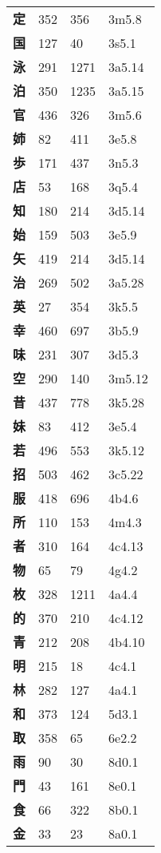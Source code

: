 \begin{longtable}[c]{llll}
    \bfseries 定 & 352 & 356 & 3m5.8\\
    \bfseries 国 & 127 & 40 & 3s5.1\\
    \bfseries 泳 & 291 & 1271 & 3a5.14\\
    \bfseries 泊 & 350 & 1235 & 3a5.15\\
    \bfseries 官 & 436 & 326 & 3m5.6\\
    \bfseries 姉 & 82 & 411 & 3e5.8\\
    \bfseries 歩 & 171 & 437 & 3n5.3\\
    \bfseries 店 & 53 & 168 & 3q5.4\\
    \bfseries 知 & 180 & 214 & 3d5.14\\
    \bfseries 始 & 159 & 503 & 3e5.9\\
    \bfseries 矢 & 419 & 214 & 3d5.14\\
    \bfseries 治 & 269 & 502 & 3a5.28\\
    \bfseries 英 & 27 & 354 & 3k5.5\\
    \bfseries 幸 & 460 & 697 & 3b5.9\\
    \bfseries 味 & 231 & 307 & 3d5.3\\
    \bfseries 空 & 290 & 140 & 3m5.12\\
    \bfseries 昔 & 437 & 778 & 3k5.28\\
    \bfseries 妹 & 83 & 412 & 3e5.4\\
    \bfseries 若 & 496 & 553 & 3k5.12\\
    \bfseries 招 & 503 & 462 & 3c5.22\\
    \bfseries 服 & 418 & 696 & 4b4.6\\
    \bfseries 所 & 110 & 153 & 4m4.3\\
    \bfseries 者 & 310 & 164 & 4c4.13\\
    \bfseries 物 & 65 & 79 & 4g4.2\\
    \bfseries 枚 & 328 & 1211 & 4a4.4\\
    \bfseries 的 & 370 & 210 & 4c4.12\\
    \bfseries 青 & 212 & 208 & 4b4.10\\
    \bfseries 明 & 215 & 18 & 4c4.1\\
    \bfseries 林 & 282 & 127 & 4a4.1\\
    \bfseries 和 & 373 & 124 & 5d3.1\\
    \bfseries 取 & 358 & 65 & 6e2.2\\
    \bfseries 雨 & 90 & 30 & 8d0.1\\
    \bfseries 門 & 43 & 161 & 8e0.1\\
    \bfseries 食 & 66 & 322 & 8b0.1\\
    \bfseries 金 & 33 & 23 & 8a0.1\\
  \end{longtable}
